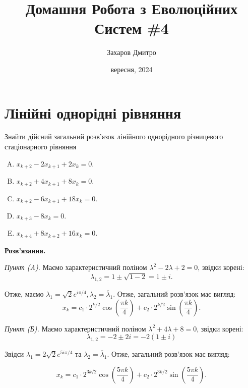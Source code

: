 \documentclass{hw_template}
\title{\huge\sffamily\bfseries Домашня Робота з Еволюційних Систем \#4}
\author{\Large\sffamily Захаров Дмитро}
\date{\sffamily 20 вересня, 2024}
\begin{document}
\pagestyle{fancy}

\maketitle

\tableofcontents

\pagebreak

\section{Лінійні однорідні рівняння}

\begin{problem}
    Знайти дійсний загальний розв’язок лінійного однорідного різницевого стаціонарного рівняння
    \begin{enumerate}[(A)]
        \item $x_{k+2}-2x_{k+1}+2x_k = 0$.
        \item $x_{k+2}+4x_{k+1}+8x_k = 0$.
        \item $x_{k+2}-6x_{k+1}+18x_k = 0$.
        \item $x_{k+3} - 8x_k = 0$.
        \item $x_{k+4}+8x_{k+2}+16x_k = 0$.
    \end{enumerate}
\end{problem}

\textbf{Розв'язання.} 

\textit{Пункт (A).} Маємо характеристичний поліном $\lambda^2-2\lambda+2=0$, звідки корені:
\begin{equation*}
    \lambda_{1,2} = 1 \pm \sqrt{1-2} = 1 \pm i.
\end{equation*}

Отже, маємо $\lambda_1 = \sqrt{2}e^{i\pi/4}, \lambda_2 = \overline{\lambda}_1$. Отже, загальний розв'язок має вигляд:
\begin{equation*}
    x_k = c_1 \cdot 2^{k/2}\cos\left(\frac{\pi k}{4}\right) + c_2\cdot 2^{k/2}\sin\left(\frac{\pi k}{4}\right).
\end{equation*}

\textit{Пункт (Б).} Маємо характеристичний поліном $\lambda^2+4\lambda+8=0$, звідки корені:
\begin{equation*}
    \lambda_{1,2} = -2 \pm 2i = -2(1 \pm i)
\end{equation*}

Звідси $\lambda_1 = 2\sqrt{2}e^{5i\pi/4}$ та $\lambda_2 = \overline{\lambda}_1$. Отже, загальний розв'язок має вигляд:

\begin{equation*}
    x_k = c_1 \cdot 2^{3k/2}\cos\left(\frac{5\pi k}{4}\right) + c_2\cdot 2^{3k/2}\sin\left(\frac{5\pi k}{4}\right).
\end{equation*}
\end{document}
